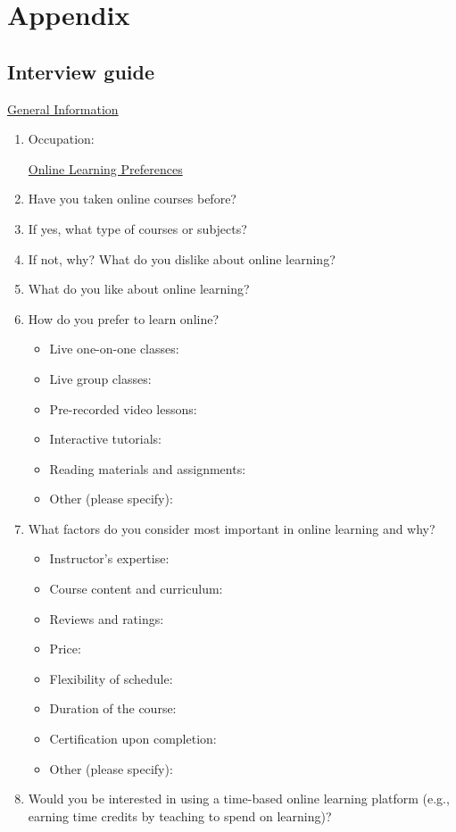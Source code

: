 \chapter{Appendix}\label{ch:appendix}


\section{Interview guide}\label{sec:interview-guide}

\underline{General Information}
\begin{enumerate}
    \item Occupation:

    \underline{Online Learning Preferences}
    \item Have you taken online courses before?
    \item If yes, what type of courses or subjects?
    \item If not, why?
    What do you dislike about online learning?
    \item What do you like about online learning?
    \item How do you prefer to learn online?

    \begin{itemize}
        \item Live one-on-one classes:
        \item Live group classes:
        \item Pre-recorded video lessons:
        \item Interactive tutorials:
        \item Reading materials and assignments:
        \item Other (please specify):
    \end{itemize}

    \item What factors do you consider most important in online learning and why?
    \begin{itemize}
        \item Instructor's expertise:
        \item Course content and curriculum:
        \item Reviews and ratings:
        \item Price:
        \item Flexibility of schedule:
        \item Duration of the course:
        \item Certification upon completion:
        \item Other (please specify):
    \end{itemize}
    \item Would you be interested in using a time-based online learning platform (e.g., earning time credits by teaching to spend on learning)?


\end{enumerate}

